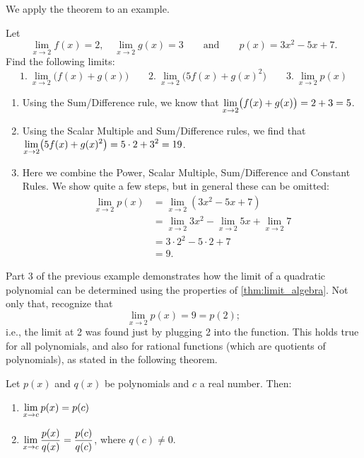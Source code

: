 We apply the theorem to an example.

\begin{example}\label{ex_basic_limit_1}%
Let\vspace{-.5\baselineskip}
\[
 \lim_{x\to 2} f(x)=2,\quad\lim_{x\to 2} g(x) = 3\qquad\text{and}\qquad
 p(x) = 3x^2-5x+7.
\]
Find the following limits:
\[
1.\ \lim_{x\to 2} \bigl(f(x) + g(x)\bigr)\qquad
2.\ \lim_{x\to 2} \bigl(5f(x) + g(x)^2\bigr)\qquad
3.\ \lim_{x\to 2} p(x)
\]
\solution
\begin{enumerate}
	\item	Using the Sum/Difference rule, we know that $\displaystyle \lim_{x\to 2} \bigl(f(x) + g(x)\bigr) = 2+3 =5$.
	\item	Using the Scalar Multiple and Sum/Difference rules, we find that\\ $\displaystyle \lim_{x\to 2} \bigl(5f(x) + g(x)^2\bigr) = 5\cdot 2 + 3^2 = 19$.
	\item	Here we combine the Power, Scalar Multiple, Sum/Difference and Constant Rules. We show quite a few steps, but in general these can be omitted:\vspace{-.5\baselineskip}
	\begin{align*}
		\lim_{x\to 2} p(x) &= \lim_{x\to 2} (3x^2-5x+7) \\
		&= \lim_{x\to 2} 3x^2-\lim_{x\to 2} 5x+\lim_{x\to 2}7 \\
		&= 3\cdot 2^2 - 5\cdot 2+7 \\
		&= 9.
	\end{align*}
\end{enumerate}
\end{example}

Part 3 of the previous example demonstrates how the limit of a quadratic polynomial can be determined using the properties of \autoref{thm:limit_algebra}. Not only that, recognize that\vspace{-.3\baselineskip}
\[\lim_{x\to 2} p(x) = 9 = p(2);\]
i.e., the limit at 2 was found just by plugging 2 into the function. This holds true for all polynomials, and also for rational functions (which are quotients of polynomials), as stated in the following theorem.

\begin{theorem}\label{thm:poly_rat}%
Let $p(x)$ and $q(x)$ be polynomials and $c$ a real number. Then:
\begin{enumerate}
\item	$\displaystyle \lim_{x\to c} p(x) = p(c)$
\item	$\displaystyle \lim_{x\to c} \frac{p(x)}{q(x)} = \frac{p(c)}{q(c)}$, where $q(c) \neq 0$.
\end{enumerate}
\end{theorem}

